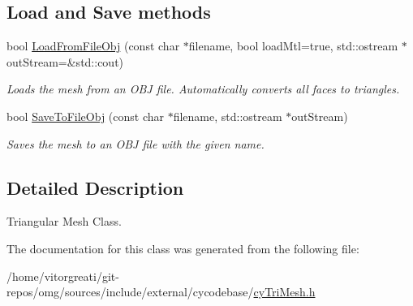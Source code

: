 \subsection*{Load and Save methods}
\begin{DoxyCompactItemize}
\item 
\mbox{\label{classcy_1_1_tri_mesh_a2d50f45e92935d1b5e5616cde20f9ef6}} 
bool \mbox{\hyperlink{classcy_1_1_tri_mesh_a2d50f45e92935d1b5e5616cde20f9ef6}{Load\+From\+File\+Obj}} (const char $\ast$filename, bool load\+Mtl=true, std\+::ostream $\ast$out\+Stream=\&std\+::cout)
\begin{DoxyCompactList}\small\item\em Loads the mesh from an O\+BJ file. Automatically converts all faces to triangles. \end{DoxyCompactList}\item 
\mbox{\label{classcy_1_1_tri_mesh_a273971c7700cdef33384dc1206800974}} 
bool \mbox{\hyperlink{classcy_1_1_tri_mesh_a273971c7700cdef33384dc1206800974}{Save\+To\+File\+Obj}} (const char $\ast$filename, std\+::ostream $\ast$out\+Stream)
\begin{DoxyCompactList}\small\item\em Saves the mesh to an O\+BJ file with the given name. \end{DoxyCompactList}\end{DoxyCompactItemize}


\subsection{Detailed Description}
Triangular Mesh Class. 

The documentation for this class was generated from the following file\+:\begin{DoxyCompactItemize}
\item 
/home/vitorgreati/git-\/repos/omg/sources/include/external/cycodebase/\mbox{\hyperlink{cy_tri_mesh_8h}{cy\+Tri\+Mesh.\+h}}\end{DoxyCompactItemize}
